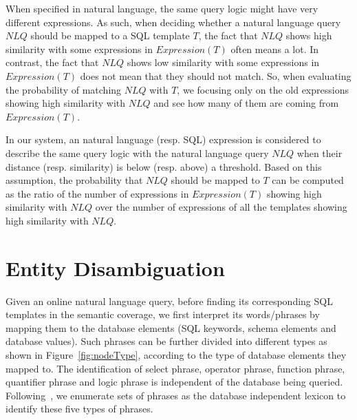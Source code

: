 \documentclass{vldb}
\begin{document}
When specified in natural language, the same query logic might have very different expressions.  As such, when deciding whether a natural language query $\mathit{NLQ}$ should be mapped to a SQL template $T$, the fact that $\mathit{NLQ}$ shows high similarity with some expressions in $\mathit{Expression(T)}$ often means a lot.  In contrast, the fact that $\mathit{NLQ}$ shows low similarity with some expressions in $\mathit{Expression(T)}$ does not mean that they should not match.  So, when evaluating the probability of matching $\mathit{NLQ}$ with $T$, we focusing only on the old expressions showing high similarity with $\mathit{NLQ}$ and see how many of them are coming from $Expression(T)$.  

In our system, an natural language (resp. SQL) expression is considered to describe the same query logic with the natural language query $\mathit{NLQ}$ when their distance (resp. similarity) is below (resp. above) a threshold.  Based on this assumption, the probability that $\mathit{NLQ}$ should be mapped to $T$ can be computed as the ratio of the number of expressions in $Expression(T)$ showing high similarity with $\mathit{NLQ}$ over the number of expressions of all the templates showing high similarity with $\mathit{NLQ}$.  

\section{Entity Disambiguation}
\label{sec:entityMapping}
Given an online natural language query, before finding its corresponding SQL templates in the semantic coverage, we first interpret its words/phrases by mapping them to the database elements (SQL keywords, schema elements and database values).  Such phrases can be further divided into different types as shown in Figure~\ref{fig:nodeType}, according to the type of database elements they mapped to.  The identification of select phrase, operator phrase, function phrase, quantifier phrase and logic phrase is independent of the database being queried.  Following~\cite{DBLP:journals/tods/LiYJ07,DBLP:journals/pvldb/LiJ14}, we enumerate sets of phrases as the database independent lexicon to identify these five types of phrases.  
\end{document}
